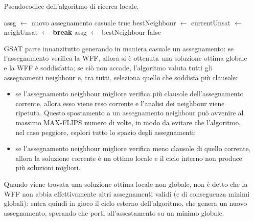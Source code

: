 \begin{algorithm}[H]
    \caption{Pseudocodice dell'algoritmo di ricerca locale.}
    \label{algo:local_search}
    \begin{algorithmic}[1]
                \State assg $\gets$ nuovo assegnamento casuale
                        \State \Return true
                    \EndIf
                    \State bestNeighbour $\gets$ 
                    \State currentUnsat $\gets$ 
                    \State neighUnsat $\gets$ 
                        \State \textbf{break}
                    \Else
                        \State assg $\gets$ bestNeighbour
                    \EndIf
                \EndFor
            \EndFor
            \State \Return false
        \EndProcedure
    \end{algorithmic}
\end{algorithm}
GSAT parte innanzitutto generando in maniera casuale un assegnamento:
se l'assegnamento verifica la WFF, allora si è ottenuta una soluzione ottima globale 
e la WFF è soddisfatta; se ciò non accade, l'algoritmo valuta tutti gli assegnamenti neighbour e, 
tra tutti, seleziona quello che soddisfa più clausole: 
\begin{itemize}
    \item se l'assegnamento neighbour migliore verifica più clausole dell'assegnamento corrente, allora esso viene reso corrente e l'analisi dei neighbour viene ripetuta.
    Questo spostamento a un assegnamento neighbour può avvenire al massimo MAX-FLIPS numero di volte, in modo da evitare che l'algoritmo, nel caso peggiore, esplori tutto lo spazio degli assegnamenti;
    \item se l'assegnamento neighbour migliore verifica meno clausole di quello corrente, allora la soluzione corrente
    è un ottimo locale e il ciclo interno non produce più soluzioni migliori.
\end{itemize}
Quando viene trovata una soluzione ottima locale non globale, non è detto che la WFF non abbia effettivamente
altri assegnamenti validi (e di conseguenza minimi globali): entra quindi in gioco
il ciclo esterno dell'algoritmo, che genera un nuovo assegnamento, sperando che porti all'assestamento
su un minimo globale.
